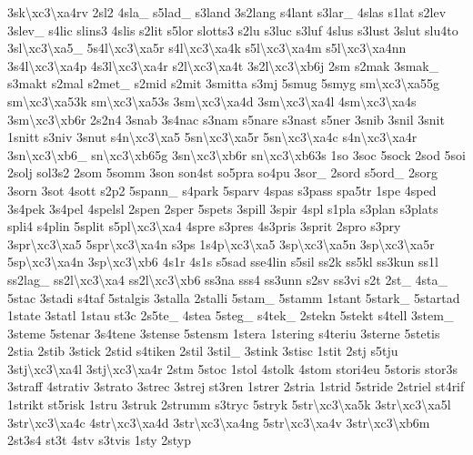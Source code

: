 \begin{DoxyCompactItemize}
3sk\textbackslash{}xc3\textbackslash{}xa4rv 2sl2 4sla\-\_\- s5lad\-\_\- s3land 3s2lang s4lant s3lar\-\_\- 4slas s1lat s2lev 3slev\-\_\- s4lic slins3 4slis s2lit s5lor slotts3 s2lu s3luc s3luf 4slus s3lust 3slut slu4to 3sl\textbackslash{}xc3\textbackslash{}xa5\-\_\- 5s4l\textbackslash{}xc3\textbackslash{}xa5r s4l\textbackslash{}xc3\textbackslash{}xa4k s5l\textbackslash{}xc3\textbackslash{}xa4m s5l\textbackslash{}xc3\textbackslash{}xa4nn 3s4l\textbackslash{}xc3\textbackslash{}xa4p 4s3l\textbackslash{}xc3\textbackslash{}xa4r s2l\textbackslash{}xc3\textbackslash{}xa4t 3s2l\textbackslash{}xc3\textbackslash{}xb6j 2sm s2mak 3smak\-\_\- s3makt s2mal s2met\-\_\- s2mid s2mit 3smitta s3mj 5smug 5smyg sm\textbackslash{}xc3\textbackslash{}xa55g sm\textbackslash{}xc3\textbackslash{}xa53k sm\textbackslash{}xc3\textbackslash{}xa53s 3sm\textbackslash{}xc3\textbackslash{}xa4d 3sm\textbackslash{}xc3\textbackslash{}xa4l 4sm\textbackslash{}xc3\textbackslash{}xa4s 3sm\textbackslash{}xc3\textbackslash{}xb6r 2s2n4 3snab 3s4nac s3nam s5nare s3nast s5ner 3snib 3snil 3snit 1snitt s3niv 3snut s4n\textbackslash{}xc3\textbackslash{}xa5 5sn\textbackslash{}xc3\textbackslash{}xa5r 5sn\textbackslash{}xc3\textbackslash{}xa4c s4n\textbackslash{}xc3\textbackslash{}xa4r 3sn\textbackslash{}xc3\textbackslash{}xb6\-\_\- sn\textbackslash{}xc3\textbackslash{}xb65g 3sn\textbackslash{}xc3\textbackslash{}xb6r sn\textbackslash{}xc3\textbackslash{}xb63s 1so 3soc 5sock 2sod 5soi 2solj sol3s2 2som 5somm 3son son4st so5pra so4pu 3sor\-\_\- 2sord s5ord\-\_\- 2sorg 3sorn 3sot 4sott s2p2 5spann\-\_\- s4park 5sparv 4spas s3pass spa5tr 1spe 4sped 3s4pek 3s4pel 4spelsl 2spen 2sper 5spets 3spill 3spir 4spl s1pla s3plan s3plats spli4 s4plin 5split s5pl\textbackslash{}xc3\textbackslash{}xa4 4spre s3pres 4s3pris 3sprit 2spro s3pry 3spr\textbackslash{}xc3\textbackslash{}xa5 5spr\textbackslash{}xc3\textbackslash{}xa4n s3ps 1s4p\textbackslash{}xc3\textbackslash{}xa5 3sp\textbackslash{}xc3\textbackslash{}xa5n 3sp\textbackslash{}xc3\textbackslash{}xa5r 5sp\textbackslash{}xc3\textbackslash{}xa4n 3sp\textbackslash{}xc3\textbackslash{}xb6 4s1r 4s1s s5sad sse4lin s5sil ss2k ss5kl ss3kun ss1l ss2lag\-\_\- ss2l\textbackslash{}xc3\textbackslash{}xa4 ss2l\textbackslash{}xc3\textbackslash{}xb6 ss3na sss4 ss3unn s2sv ss3vi s2t 2st\-\_\- 4sta\-\_\- 5stac 3stadi s4taf 5stalgis 3stalla 2stalli 5stam\-\_\- 5stamm 1stant 5stark\-\_\- 5startad 1state 3statl 1stau st3c 2s5te\-\_\- 4stea 5steg\-\_\- s4tek\-\_\- 2stekn 5stekt s4tell 3stem\-\_\- 3steme 5stenar 3s4tene 3stense 5stensm 1stera 1stering s4teriu 3sterne 5stetis 2stia 2stib 3stick 2stid s4tiken 2stil 3stil\-\_\- 3stink 3stisc 1stit 2stj s5tju 3stj\textbackslash{}xc3\textbackslash{}xa4l 3stj\textbackslash{}xc3\textbackslash{}xa4r 2stm 5stoc 1stol 4stolk 4stom stori4eu 5storis stor3s 3straff 4strativ 3strato 3strec 3strej st3ren 1strer 2stria 1strid 5stride 2striel st4rif 1strikt st5risk 1stru 3struk 2strumm s3tryc 5stryk 5str\textbackslash{}xc3\textbackslash{}xa5k 3str\textbackslash{}xc3\textbackslash{}xa5l 3str\textbackslash{}xc3\textbackslash{}xa4c 4str\textbackslash{}xc3\textbackslash{}xa4d 3str\textbackslash{}xc3\textbackslash{}xa4ng 5str\textbackslash{}xc3\textbackslash{}xa4v 3str\textbackslash{}xc3\textbackslash{}xb6m 2st3s4 st3t 4stv s3tvis 1sty 2styp 
\end{DoxyCompactItemize}

